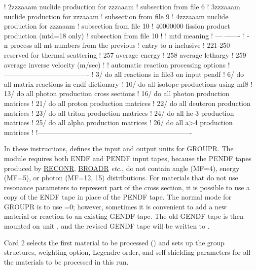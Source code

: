\begin{ccode}
   !    2zzzaaam       nuclide production for zzzaaam
   !                     subsection from file 6
   !    3zzzaaam       nuclide production for zzzaaam
   !                     subsection from file 9
   !    4zzzaaam       nuclide production for zzzaaam
   !                     subsection from file 10
   !    40000000       fission product production (mtd=18 only)
   !                     subsection from file 10
   !
   !     mtd          meaning
   !     ---          -------
   !     -n           process all mt numbers from the previous
   !                          entry to n inclusive
   !     221-250      reserved for thermal scattering
   !     257          average energy
   !     258          average lethargy
   !     259          average inverse velocity (m/sec)
   !
   !     automatic reaction processing options
   !     -------------------------------------
   !        3/        do all reactions in file3 on input pendf
   !        6/        do all matrix reactions in endf dictionary
   !       10/        do all isotope productions using mf8
   !       13/        do all photon production cross sections
   !       16/        do all photon production matrices
   !       21/        do all proton production matrices
   !       22/        do all deuteron production matrices
   !       23/        do all triton production matrices
   !       24/        do all he-3 production matrices
   !       25/        do all alpha production matrices
   !       26/        do all a>4 production matrices
   !
   !-------------------------------------------------------------------

\end{ccode}
\normalsize

In these instructions,  defines the input and output units
for GROUPR.  The module requires both ENDF and PENDF input tapes,
because the PENDF tapes produced by
\hyperlink{sRECONRhy}{RECONR},
\hyperlink{sBROADRhy}{BROADR} {\it etc.}, do not
contain angle (MF=4),
energy (MF=5), or photon (MF=12, 15) distributions.  For materials
that do not use resonance parameters to represent part of the
cross section, it is possible to use a copy of the ENDF tape in place
of the PENDF tape.  The normal mode for GROUPR is to use =0;
however, sometimes it is convenient to add a new material or reaction to
an existing GENDF tape.  The old GENDF tape is then mounted on unit
, and the revised GENDF tape will be written to .

Card 2 selects the first material to be processed () and sets
up the group structures,
weighting option, Legendre order, and
self-shielding parameters for all the materials
to be processed in this run.

